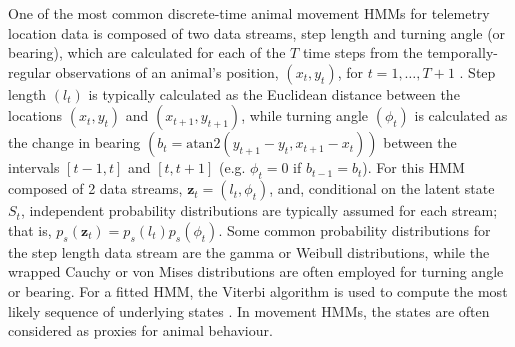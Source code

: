 \documentclass[12pt]{article}\usepackage[]{graphicx}\usepackage[]{xcolor}
\begin{document}
One of the most common discrete-time animal movement HMMs for telemetry location data is composed of two data streams, step length and turning angle (or bearing), which are calculated for each of the $T$ time steps from the temporally-regular observations of an animal's position, $(x_t,y_t)$, for $t=1,\ldots,T+1$ \citep[e.g.][]{MoralesEtAl2004,LangrockEtAl2012,McClintockEtAl2012}. Step length $(l_t)$ is typically calculated as the Euclidean distance between the locations $(x_t,y_t)$ and $(x_{t+1},y_{t+1})$, while turning angle $(\phi_t)$ is calculated as the change in bearing $\left(b_t=\text{atan2}(y_{t+1}-y_t,x_{t+1}-x_t)\right)$ between the intervals $[t-1,t]$ and $[t,t+1]$ (e.g. $\phi_t=0$ if $b_{t-1}=b_t$). For this HMM composed of 2 data streams, ${\mathbf z}_t=(l_t,\phi_t)$, and, conditional on the latent state $S_t$, independent probability distributions are typically assumed for each stream; that is, $p_s({\mathbf z}_t)=p_s(l_t)p_s(\phi_t)$. Some common probability distributions for the step length data stream are the gamma or Weibull distributions, while the wrapped Cauchy or von Mises distributions are often employed for turning angle or bearing. For a fitted HMM, the Viterbi algorithm is used to compute the most likely sequence of underlying states \citep{ZucchiniEtAl2016}. In movement HMMs, the states are often considered as proxies for animal behaviour.
\end{document}
